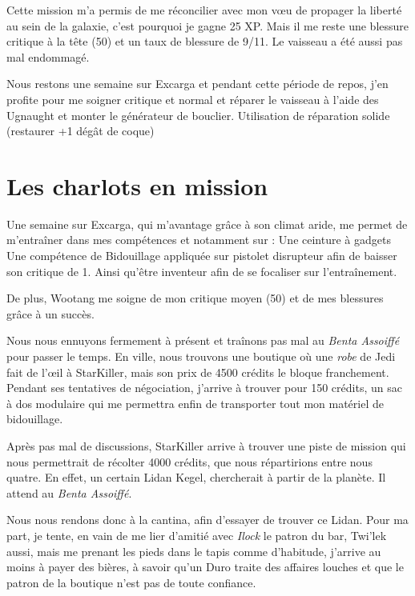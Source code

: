 \documentclass[a4paper,9pt,twoside,twocolumn,openany]{book}
\begin{document}
Cette mission m’a permis de me réconcilier avec mon vœu de propager la liberté au sein de la galaxie, c’est pourquoi je gagne 25 XP. Mais il me reste une blessure critique à la tête (50) et un taux de blessure de 9/11. Le vaisseau a été aussi pas mal endommagé.

Nous restons une semaine sur Excarga et pendant cette période de repos, j’en profite pour me soigner critique et normal et réparer le vaisseau à l’aide des Ugnaught et monter le générateur de bouclier. Utilisation de réparation solide (restaurer +1 dégât de coque)

\chapter{Les charlots en mission}
\subtitle{May the 4th, 2016 \newline Scénario custom}

Une semaine sur Excarga, qui m’avantage grâce à son climat aride, me permet de m’entraîner dans mes compétences et notamment sur :
Une ceinture à gadgets
Une compétence de Bidouillage appliquée sur pistolet disrupteur afin de baisser son critique de 1.
Ainsi qu’être inventeur afin de se focaliser sur l’entraînement.

De plus, Wootang me soigne de mon critique moyen (50) et de mes blessures grâce à un succès.

Nous nous ennuyons fermement à présent et traînons pas mal au \emph{Benta Assoiffé} pour passer le temps. En ville, nous trouvons une boutique où une \emph{robe} de Jedi fait de l’œil à StarKiller, mais son prix de 4500 crédits le bloque franchement. Pendant ses tentatives de négociation, j'arrive à trouver pour 150 crédits, un sac à dos modulaire qui me permettra enfin de transporter tout mon matériel de bidouillage.

Après pas mal de discussions, StarKiller arrive à trouver une piste de mission qui nous permettrait de récolter 4000 crédits, que nous répartirions entre nous quatre. En effet, un certain Lidan Kegel, chercherait à partir de la planète. Il attend au \emph{Benta Assoiffé}.

Nous nous rendons donc à la cantina, afin d'essayer de trouver ce Lidan. Pour ma part, je tente, en vain de me lier d’amitié avec \emph{Ilock} le patron du bar, Twi'lek aussi, mais me prenant les pieds dans le tapis comme d’habitude, j'arrive au moins à payer des bières, à savoir qu’un Duro traite des affaires louches et que le patron de la boutique n’est pas de toute confiance.
\end{document}
